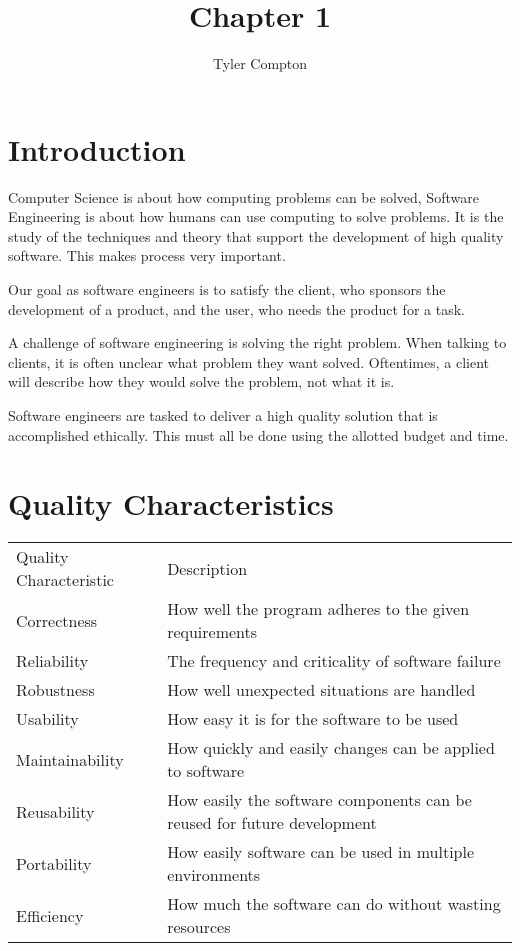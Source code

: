 \documentclass{article}
\author{Tyler Compton}
\title{Chapter 1}
\begin{document}
\maketitle
\tableofcontents

\section{Introduction}
Computer Science is about how computing problems can be solved, Software
Engineering is about how humans can use computing to solve problems. It is the
study of the techniques and theory that support the development of high quality
software. This makes process very important.

Our goal as software engineers is to satisfy the client, who sponsors the
development of a product, and the user, who needs the product for a task.

A challenge of software engineering is solving the right problem. When talking
to clients, it is often unclear what problem they want solved. Oftentimes, a
client will describe how they would solve the problem, not what it is.

Software engineers are tasked to deliver a high quality solution that is
accomplished ethically. This must all be done using the allotted budget and
time.

\section{Quality Characteristics}
\begin{table}[H]
	\centering
	\begin{tabular}{ l l }
		Quality Characteristic & Description \\
		Correctness & How well the program adheres to the given requirements \\
		Reliability & The frequency and criticality of software failure \\
		Robustness & How well unexpected situations are handled \\
		Usability & How easy it is for the software to be used \\
		Maintainability & How quickly and easily changes can be applied to software \\
		Reusability & How easily the software components can be reused for future development \\
		Portability & How easily software can be used in multiple environments \\
		Efficiency & How much the software can do without wasting resources \\
	\end{tabular}
\end{table}
\end{document}
